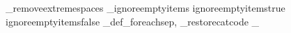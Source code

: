 \def\itemtomacro#1[#2]{%
	\edef\loi_listname{\loi_macroname#1}%
	\expandafter\itemtomacro_a\expanded{\loi_normalizeindex{\loi_listname}{#2}}\let
}
\def\gitemtomacro#1[#2]{%
	\xdef\loi_listname{\loi_macroname#1}%
	\expandafter\itemtomacro_a\expanded{\loi_normalizeindex{\loi_listname}{#2}}{\global\let}%
}
\def\itemtomacro_a#1#2#3#4{%
	\loi_ifempty{#1}{}{\loi_error{#1}}%
	\loi_argcsname#3#4{\loi_listname[#2]}%
}

\newif\if_removeextremespaces
\newif\if_ignoreemptyitems
\let\ignoreemptyitems\_ignoreemptyitemstrue
\let\reademptyitems\_ignoreemptyitemsfalse
\loi_def_foreachsep{,}
\loi_restorecatcode
\reademptyitems
\setsepchar{,}
\endinput

